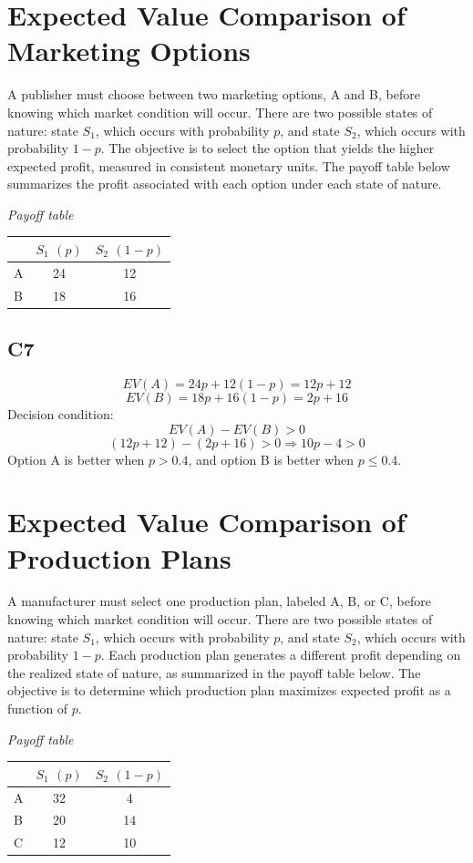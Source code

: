 \begin{ExamProblems}
		\section{Expected Value Comparison of Marketing Options}
		A publisher must choose between two marketing options, A and B, before knowing which market condition will occur.
		There are two possible states of nature: state $S_1$, which occurs with probability $p$, and state $S_2$, which occurs with probability $1-p$.
		The objective is to select the option that yields the higher expected profit, measured in consistent monetary units.
		The payoff table below summarizes the profit associated with each option under each state of nature.
		\begin{center}
			\textit{Payoff table} \\
			\begin{tabular}{l c c}
				\toprule
				& $S_1$ $(p)$ & $S_2$ $(1-p)$ \\
				\midrule
				A & 24 & 12 \\
				B & 18 & 16 \\
				\bottomrule
			\end{tabular}
		\end{center}
		
		\subsection*{C7}
		\[
		EV(A)=24p+12(1-p)=12p+12
		\]
		\[
		EV(B)=18p+16(1-p)=2p+16
		\]
		Decision condition:
		\[
		EV(A)-EV(B)>0
		\]
		\[
		(12p+12)-(2p+16)>0 \Rightarrow 10p-4>0
		\]
		Option A is better when $p>0.4$, and option B is better when $p \le 0.4$.
		
		\item
		\section{Expected Value Comparison of Production Plans}
		A manufacturer must select one production plan, labeled A, B, or C, before knowing which market condition will occur.
		There are two possible states of nature: state $S_1$, which occurs with probability $p$, and state $S_2$, which occurs with probability $1-p$.
		Each production plan generates a different profit depending on the realized state of nature, as summarized in the payoff table below.
		The objective is to determine which production plan maximizes expected profit as a function of $p$.
		
		\begin{center}
			\textit{Payoff table} \\
			\begin{tabular}{l c c}
				\toprule
				& $S_1$ $(p)$ & $S_2$ $(1-p)$ \\
				\midrule
				A & 32 & 4 \\
				B & 20 & 14 \\
				C & 12 & 10 \\
				\bottomrule
			\end{tabular}
		\end{center}
		

\end{ExamProblems}
